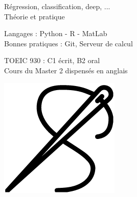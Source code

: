 

Régression, classification, deep, ... \\
Théorie et pratique\\
\vspace{0.3cm}

Langages :  Python - R - MatLab \\
Bonnes pratiques : Git, Serveur de calcul
\vspace{0.3cm}


TOEIC 930 : C1 écrit, B2 oral\\
Cours du Master 2 dispensés en anglais



\begin{center}
    \faItunesNote  \hspace{0.5cm}
    \faPlane \hspace{0.5cm} \faPalette \hspace{0.5cm} \includegraphics[width=0.05\linewidth]{CV/CV_english2/needle.png}  \hspace{0.5cm}  
    \faWrench 
\end{center}

